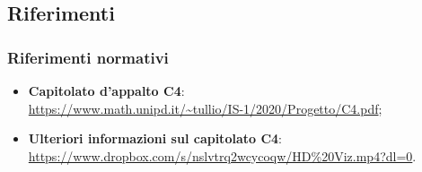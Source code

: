 \subsection{Riferimenti}
\label{sub:riferimenti}

\subsubsection{Riferimenti normativi}

\begin{itemize}
    \item \textbf{Capitolato d'appalto \textsc{C4}}: \\
    \url{https://www.math.unipd.it/~tullio/IS-1/2020/Progetto/C4.pdf};
    \item \textbf{Ulteriori informazioni sul capitolato C4}: \\
    \url{https://www.dropbox.com/s/nslvtrq2wcycoqw/HD\%20Viz.mp4?dl=0}.
\end{itemize}

